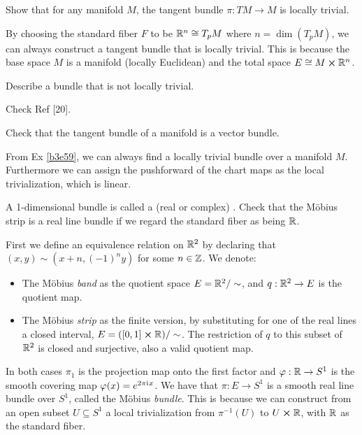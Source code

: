 \documentclass[10pt]{article}
\begin{document}
\begin{example}\label{b3e59}
	Show that for any manifold $M$, the tangent bundle $\pi:TM\to M$ is locally trivial.
\end{example}
\sol By choosing the standard fiber $F$ to be $\mathbb{R}^n \cong T_pM$ where $n = \dim(T_pM)$, we can always construct a tangent bundle that is locally trivial. This is because the base space $M$ is a manifold (locally Euclidean) and the total space $E \cong M \cross \mathbb{R}^n$.


\begin{example}
	Describe a bundle that is not locally trivial.
\end{example}
\sol Check Ref [20].


\begin{example}
	Check that the tangent bundle of a manifold is a vector bundle.
\end{example}
\sol From Ex \ref{b3e59}, we can always find a locally trivial bundle over a manifold $M$. Furthermore we can assign the pushforward of the chart maps as the local trivialization, which is linear.


\begin{example}\label{b2e62}
	A 1-dimensional bundle is called a (real or complex) . Check that the Möbius strip is a real line bundle if we regard the standard fiber as being $\mathbb{R}$.
\end{example}
\sol First we define an equivalence relation on $\mathbb{R}^2$ by declaring that $(x,y) \sim (x+n,(-1)^ny)$ for some $n \in \mathbb{Z}$. We denote:
\begin{itemize}
	\item The Möbius \emph{band} as the quotient space $E = \mathbb{R}^2 / \sim$, and $q:\mathbb{R}^2 \to E$ is the quotient map.
	\begin{marginfigure}
		\centering
		\caption{Commutative diagram of the Möbius bundle morphism}
	\end{marginfigure}
	\item The Möbius \emph{strip} as the finite version, by substituting for one of the real lines a closed interval, $E = ([0,1] \cross \mathbb{R}) / \sim$. The restriction of $q$ to this subset of $\mathbb{R}^2$ is closed and surjective, also a valid quotient map.
\end{itemize}
In both cases $\pi_1$ is the projection map onto the first factor and $\varphi: \mathbb{R} \to S^1$ is the smooth covering map $\varphi(x) = e^{2\pi\mathrm{i}\mkern1mu x}$. We have that $\pi:E\to S^1$ is a smooth real line bundle over $S^1$, called the Möbius \emph{bundle}. This is because we can construct from an open subset $U \subseteq S^1$ a local trivialization from $\pi^{-1}(U)$ to $U \cross \mathbb{R}$, with $\mathbb{R}$ as the standard fiber.
\end{document}
